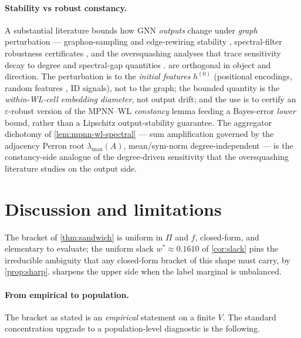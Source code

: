 \documentclass[10pt]{article}
\theoremstyle{definition}
\theoremstyle{remark}
\begin{document}
\paragraph{Stability vs robust constancy.} A substantial
literature bounds how GNN \emph{outputs} change under
\emph{graph} perturbation --- graphon-sampling and edge-rewiring
stability \citep{gama2020stability}, spectral-filter robustness
certificates \citep{kenlay2021stability}, and the oversquashing
analyses that trace sensitivity decay to degree and
spectral-gap quantities \citep{alon2021bottleneck,topping2022oversquashing,digiovanni2023oversquashing}.
 are orthogonal in
object and direction. The perturbation is to the \emph{initial
features} $h^{(0)}$ (positional encodings, random features
\citep{sato2021random}, ID signals), not to the graph; the
bounded quantity is the \emph{within-WL-cell embedding
diameter}, not output drift; and the use is to certify an
$\varepsilon$-robust version of the MPNN--WL \emph{constancy}
lemma feeding a Bayes-error \emph{lower} bound, rather than a
Lipschitz output-stability guarantee. The aggregator dichotomy
of \cref{lem:mpnn-wl-spectral} --- sum amplification governed by
the adjacency Perron root $\lambda_{\max}(A)$, mean/sym-norm
degree-independent --- is the constancy-side analogue of the
degree-driven sensitivity that the oversquashing literature
studies on the output side.

\section{Discussion and limitations}\label{sec:discuss}

The bracket of \cref{thm:sandwich} is uniform in $\Pi$ and $f$,
closed-form, and elementary to evaluate; the uniform slack
$w^{*} \approx 0.1610$ of \cref{cor:slack} pins the irreducible
ambiguity that any closed-form bracket of this shape must carry,
by \cref{prop:sharp}.  sharpens the upper
side when the label marginal is unbalanced.

\paragraph{From empirical to population.} The bracket as stated
is an \emph{empirical} statement on a finite $V$. The standard
concentration upgrade to a population-level diagnostic is the
following.
\end{document}
